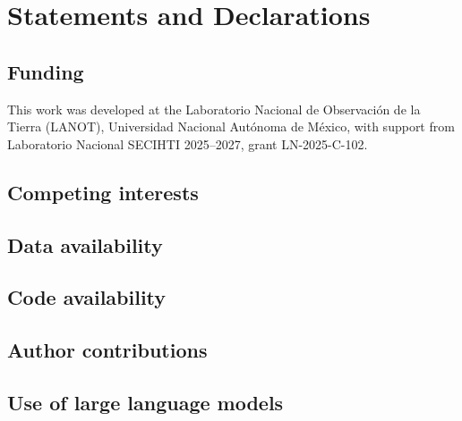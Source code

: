 \documentclass[11pt]{article}
\begin{document}
\section*{Statements and Declarations}

\subsection*{Funding}
This work was developed at the Laboratorio Nacional de Observaci\'on de la
Tierra (LANOT), Universidad Nacional Aut\'onoma de M\'exico, with support from
Laboratorio Nacional SECIHTI 2025--2027, grant LN-2025-C-102.

\subsection*{Competing interests}

\subsection*{Data availability}

\subsection*{Code availability}

\subsection*{Author contributions}

\subsection*{Use of large language models}



\end{document}

